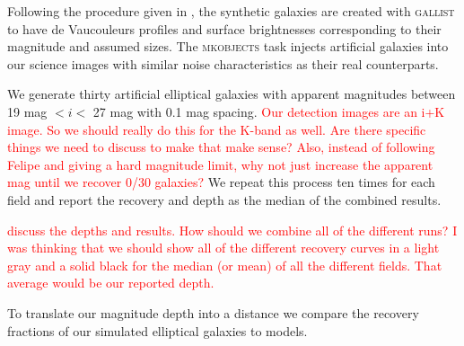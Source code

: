 \documentclass[apj, revtex4]{emulateapj}
\newcommand{\editorial}[1]{\textcolor{red}{#1}}
\begin{document}
Following the procedure given in \cite{Menanteau2010a}, the synthetic galaxies are created with \textsc{gallist} to have de Vaucouleurs \citep{DeVaucouleurs1948} profiles and surface brightnesses corresponding to their magnitude and assumed sizes. The \textsc{mkobjects} task injects artificial galaxies into our science images with similar noise characteristics as their real counterparts.

We generate thirty artificial elliptical galaxies with apparent magnitudes between 19 mag $< i <$ 27 mag with 0.1 mag spacing. \editorial{Our detection images are an i+K image. So we should really do this for the K-band as well. Are there specific things we need to discuss to make that make sense? Also, instead of following Felipe and giving a hard magnitude limit, why not just increase the apparent mag until we recover 0/30 galaxies?} We repeat this process ten times for each field and report the recovery and depth as the median of the combined results. 

\editorial{discuss the depths and results. How should we combine all of the different runs? I was thinking that we should show all of the different recovery curves in a light gray and a solid black for the median (or mean) of all the different fields. That average would be our reported depth.}

To translate our magnitude depth into a distance we compare the recovery fractions of our simulated elliptical galaxies to models.


\end{document}
